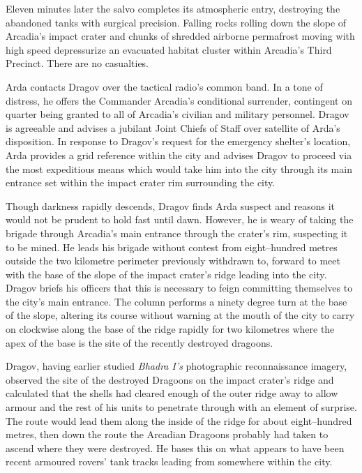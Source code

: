 Eleven minutes later the salvo completes its atmospheric entry, destroying the abandoned tanks with surgical precision. Falling rocks rolling down the slope of Arcadia's impact crater and chunks of shredded airborne permafrost moving with high speed depressurize an evacuated habitat cluster within Arcadia's Third Precinct. There are no casualties.

Arda contacts Dragov over the tactical radio's common band. In a tone of distress, he offers the Commander Arcadia's conditional surrender, contingent on quarter being granted to all of Arcadia's civilian and military personnel. Dragov is agreeable and advises a jubilant Joint Chiefs of Staff over satellite of Arda's disposition. In response to Dragov's request for the emergency shelter's location, Arda provides a grid reference within the city and advises Dragov to proceed via the most expeditious means which would take him into the city through its main entrance set within the impact crater rim surrounding the city.

Though darkness rapidly descends, Dragov finds Arda suspect and reasons it would not be prudent to hold fast until dawn. However, he is weary of taking the brigade through Arcadia's main entrance through the crater's rim, suspecting it to be mined. He leads his brigade without contest from eight--hundred metres outside the two kilometre perimeter previously withdrawn to, forward to meet with the base of the slope of the impact crater's ridge leading into the city. Dragov briefs his officers that this is necessary to feign committing themselves to the city's main entrance. The column performs a ninety degree turn at the base of the slope, altering its course without warning at the mouth of the city to carry on clockwise along the base of the ridge rapidly for two kilometres where the apex of the base is the site of the recently destroyed dragoons.

Dragov, having earlier studied {\it Bhadra I's} photographic reconnaissance imagery, observed the site of the destroyed Dragoons on the impact crater's ridge and calculated that the shells had cleared enough of the outer ridge away to allow armour and the rest of his units to penetrate through with an element of surprise. The route would lead them along the inside of the ridge for about eight--hundred metres, then down the route the Arcadian Dragoons probably had taken to ascend where they were destroyed. He bases this on what appears to have been recent armoured rovers' tank tracks leading from somewhere within the city.

